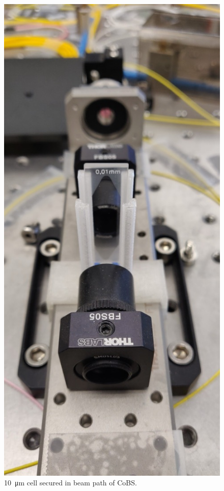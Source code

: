 \begin{figure}[t]
  \centering
  \includegraphics[width=\textwidth]{figs/4-Raman/10umCS2.jpg}
  \caption{\SI{10}{\micro\meter}  cell secured in beam path of \acl{CoBS}.}
  \label{fig:Raman:10umCS2}
\end{figure}

